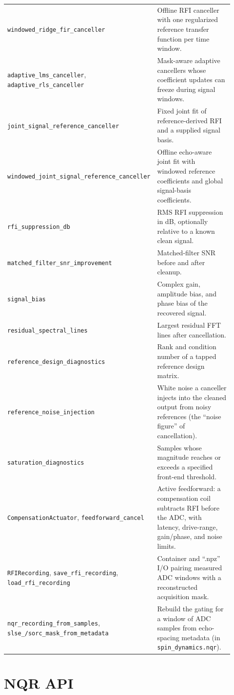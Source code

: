 \documentclass[11pt,oneside]{report}
\newcommand{\code}[1]{\texttt{#1}}
\begin{document}
\begin{longtable}{p{0.42\linewidth}p{0.50\linewidth}}
\code{windowed\_ridge\_fir\_canceller} & Offline RFI canceller with one regularized reference transfer function per time window. \\
\code{adaptive\_lms\_canceller}, \code{adaptive\_rls\_canceller} & Mask-aware adaptive cancellers whose coefficient updates can freeze during signal windows. \\
\code{joint\_signal\_reference\_canceller} & Fixed joint fit of reference-derived RFI and a supplied signal basis. \\
\code{windowed\_joint\_signal\_\allowbreak reference\_canceller} & Offline echo-aware joint fit with windowed reference coefficients and global signal-basis coefficients. \\
\code{rfi\_suppression\_db} & RMS RFI suppression in dB, optionally relative to a known clean signal. \\
\code{matched\_filter\_snr\_improvement} & Matched-filter SNR before and after cleanup. \\
\code{signal\_bias} & Complex gain, amplitude bias, and phase bias of the recovered signal. \\
\code{residual\_spectral\_lines} & Largest residual FFT lines after cancellation. \\
\code{reference\_design\_diagnostics} & Rank and condition number of a tapped reference design matrix. \\
\code{reference\_noise\_injection} & White noise a canceller injects into the cleaned output from noisy references (the ``noise figure'' of cancellation). \\
\code{saturation\_diagnostics} & Samples whose magnitude reaches or exceeds a specified front-end threshold. \\
\code{CompensationActuator}, \code{feedforward\_cancel} & Active feedforward: a compensation coil subtracts RFI before the ADC, with latency, drive-range, gain/phase, and noise limits. \\
\code{RFIRecording}, \code{save\_rfi\_recording}, \code{load\_rfi\_recording} & Container and ``.npz'' I/O pairing measured ADC windows with a reconstructed acquisition mask. \\
\code{nqr\_recording\_from\_samples}, \code{slse\_/sorc\_mask\_from\_metadata} & Rebuild the gating for a window of ADC samples from echo-spacing metadata (in \code{spin\_dynamics.nqr}). \\
\bottomrule
\end{longtable}

\section{NQR API}
\end{document}
